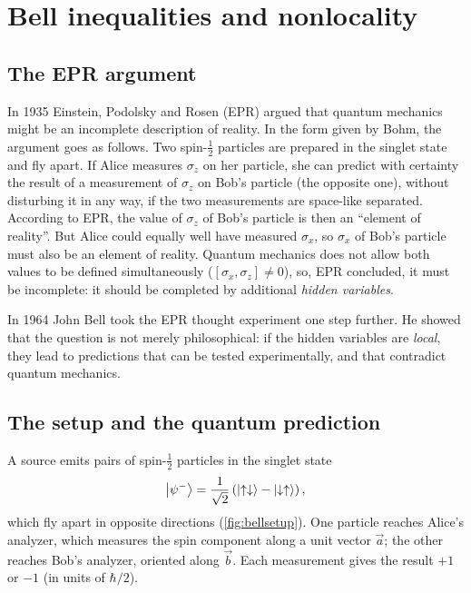 \chapter{Bell inequalities and nonlocality}\label{ch:bell}

\section{The EPR argument}
In 1935 Einstein, Podolsky and Rosen (EPR) \cite{EPR1935} argued that quantum mechanics might be an incomplete description of reality. In the form
given by Bohm, the argument goes as follows. Two spin-$\frac12$ particles are prepared in the singlet state and fly apart. If Alice measures $\sigma_z$ on
her particle, she can predict with certainty the result of a measurement of $\sigma_z$ on Bob's particle (the opposite one), without disturbing it in any way,
if the two measurements are space-like separated. According to EPR, the value of $\sigma_z$ of Bob's particle is then an ``element of reality''. But Alice
could equally well have measured $\sigma_x$, so $\sigma_x$ of Bob's particle must also be an element of reality. Quantum mechanics does not allow both
values to be defined simultaneously ($[\sigma_x,\sigma_z]\neq0$), so, EPR concluded, it must be incomplete: it should be completed by additional
\emph{hidden variables}.

In 1964 John Bell \cite{Bell1964} took the EPR thought experiment one step further. He showed that the question is not merely philosophical: if the hidden
variables are \emph{local}, they lead to predictions that can be tested experimentally, and that contradict quantum mechanics.

\section{The setup and the quantum prediction}
A source emits pairs of spin-$\frac12$ particles in the singlet state
\begin{equation}
  \left|\psi^-\right\rangle=\frac1{\sqrt2}\left(\left|\uparrow\downarrow\right\rangle-\left|\downarrow\uparrow\right\rangle\right),
\end{equation}
which fly apart in opposite directions (\cref{fig:bellsetup}). One particle reaches Alice's analyzer, which measures the spin component along a unit
vector $\vec a$; the other reaches Bob's analyzer, oriented along $\vec b$. Each measurement gives the result $+1$ or $-1$ (in units of $\hbar/2$).

